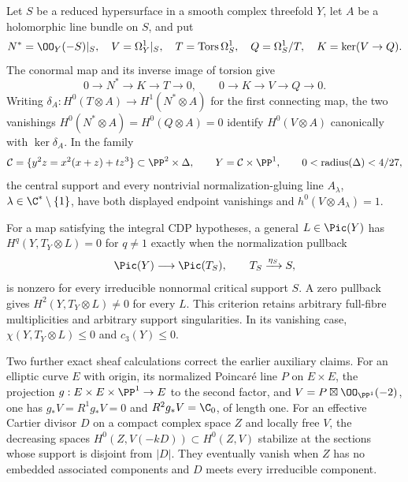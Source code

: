\hypertarget{main-II-A}{}
\begin{maintheorem}
\hypertarget{tag-03K2}{}\label{series:II:A}
Let $S$ be a reduced hypersurface in a smooth complex threefold $Y$,
let $A$ be a holomorphic line bundle on $S$, and put
\[
 N^*=\OO_Y(-S)|_S,\quad V=\Omega_Y^1|_S,\quad
 T=\operatorname{Tors}\Omega_S^1,\quad Q=\Omega_S^1/T,
 \quad K=\ker(V\to Q).
\]
The conormal map and its inverse image of torsion give
\[
 0\to N^*\to K\to T\to0,
 \qquad 0\to K\to V\to Q\to0.
\]
Writing $\delta_A:H^0(T\otimes A)\to H^1(N^*\otimes A)$
for the first connecting map, the two vanishings
$H^0(N^*\otimes A)=H^0(Q\otimes A)=0$ identify
$H^0(V\otimes A)$ canonically with $\ker\delta_A$.
In the family
\[
 \mathcal C=\{y^2z=x^2(x+z)+tz^3\}\subset\PP^2\times\Delta,
 \qquad Y=\mathcal C\times\PP^1,
 \qquad 0<\operatorname{radius}(\Delta)<4/27,
\]
the central support and every nontrivial normalization-gluing line
$A_\lambda$, $\lambda\in\C^*\setminus\{1\}$, have both displayed
endpoint vanishings and $h^0(V\otimes A_\lambda)=1$.

For a map satisfying the integral CDP hypotheses, a general
$L\in\Pic(Y)$ has $H^q(Y,T_Y\otimes L)=0$ for $q\ne1$
exactly when the normalization pullback
\[
 \Pic(Y)\longrightarrow\Pic(T_S),\qquad
 T_S\xrightarrow{\eta_S}S,
\]
is nonzero for every irreducible nonnormal critical support $S$.
A zero pullback gives $H^2(Y,T_Y\otimes L)\ne0$ for every $L$.
This criterion retains arbitrary full-fibre multiplicities and
arbitrary support singularities. In its vanishing case,
$\chi(Y,T_Y\otimes L)\le0$ and $c_3(Y)\le0$.

Two further exact sheaf calculations correct the earlier auxiliary
claims. For an elliptic curve $E$ with origin, its normalized
Poincar\'e line $P$ on $E\times E$, the projection
$g:E\times E\times\PP^1\to E$ to the second factor, and
$V=P\boxtimes\OO_{\PP^1}(-2)$, one has
$g_*V=R^1g_*V=0$ and $R^2g_*V=\C_0$, of length one.
For an effective Cartier divisor $D$ on a compact complex space
$Z$ and locally free $V$, the decreasing spaces
$H^0(Z,V(-kD))\subset H^0(Z,V)$ stabilize at the sections whose
support is disjoint from $|D|$. They eventually vanish when $Z$
has no embedded associated components and $D$ meets every
irreducible component.

\end{maintheorem}

